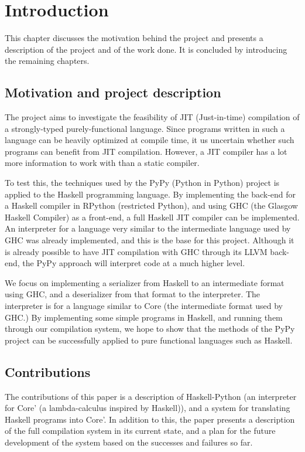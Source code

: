 
\chapter{Introduction}

This chapter discusses the motivation behind the project and 
presents a description of the project and of the work done. It 
is concluded by introducing the remaining chapters.

\section{Motivation and project description}

The project aims to investigate the feasibility of JIT (Just-in-time) 
compilation of a strongly-typed purely-functional language. Since
programs written in such a language can be heavily optimized at 
compile time, it us uncertain whether such programs can benefit from
JIT compilation. However, a JIT compiler has a lot more information to
work with than a static compiler. 

To test this, the techniques 
used by the PyPy (Python in Python) project is applied to the Haskell 
programming language. By implementing the back-end for a Haskell compiler 
in RPython (restricted Python), and using GHC (the Glasgow Haskell Compiler) 
as a front-end, a full Haskell JIT compiler can be implemented. An 
interpreter for a language very similar to the intermediate language used
by GHC was already implemented, and this is the base for this project.
Although it is already possible to have JIT compilation with GHC through
its LLVM back-end, the PyPy approach will interpret code at a much higher level.

We focus on implementing a serializer from Haskell to an intermediate
format using GHC, and a deserializer from that format to the interpreter. The 
interpreter is for a language similar to Core (the intermediate format used by GHC.)
By implementing some simple programs in Haskell, and running them through our 
compilation system, 
we hope to show that the methods of the PyPy project can be successfully applied 
to pure functional languages such as Haskell.

\section{Contributions}
The contributions of this paper is a description of Haskell-Python (an
interpreter for Core' (a lambda-calculus inspired by Haskell)), and a system for
translating Haskell programs into Core'. In addition to this, the paper 
presents a description of the full compilation system in its current state,
and a plan for the future development of the system based on the 
successes and failures so far.

